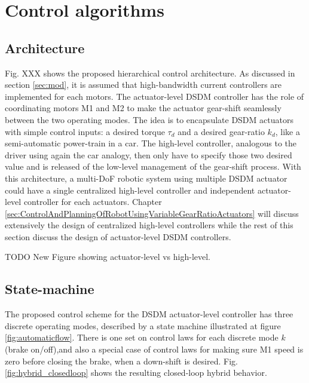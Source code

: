 
\newpage

\section{Control algorithms}

\subsection{Architecture}

Fig. XXX shows the proposed hierarchical control architecture. As discussed in section \ref{sec:mod}, it is assumed that high-bandwidth current controllers are implemented for each motors. The actuator-level DSDM controller has the role of coordinating motors M1 and M2 to make the actuator gear-shift seamlessly between the two operating modes. The idea is to encapsulate DSDM actuators with simple control inputs: a desired torque $\tau_d$ and a desired gear-ratio $k_d$, like a semi-automatic power-train in a car. The high-level controller, analogous to the driver using again the car analogy, then only have to specify those two desired value and is released of the low-level management of the gear-shift process. With this architecture, a multi-DoF robotic system using multiple DSDM actuator could have a single centralized high-level controller and independent actuator-level controller for each actuators. Chapter \ref{sec:ControlAndPlanningOfRobotUsingVariableGearRatioActuators} will discuss extensively the design of centralized high-level controllers while the rest of this section discuss the design of actuator-level DSDM controllers. 

TODO New Figure showing actuator-level vs high-level. 

\subsection{State-machine}

The proposed control scheme for the DSDM actuator-level controller has three discrete operating modes, described by a state machine illustrated at figure \ref{fig:automaticflow}. There is one set on control laws for each discrete mode $k$ (brake on/off),and also a special case of control laws for making sure M1 speed is zero before closing the brake, when a down-shift is desired. Fig. \ref{fig:hybrid_closedloop} shows the resulting closed-loop hybrid behavior.

